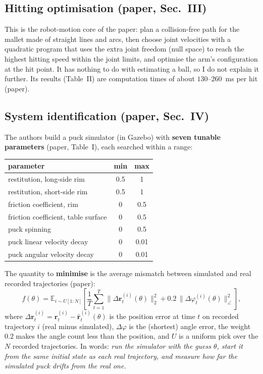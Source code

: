 \documentclass[11pt,a4paper]{article}
\begin{document}
\subsection{Hitting optimisation (paper, Sec.~III)}
This is the robot-motion core of the paper: plan a collision-free path for the mallet made of
straight lines and arcs, then choose joint velocities with a quadratic program that uses the extra
joint freedom (null space) to reach the highest hitting speed within the joint limits, and
optimise the arm's configuration at the hit point. It has nothing to do with estimating a ball, so
I do not explain it further. Its results (Table~II) are computation times of about $130$--$260$~ms
per hit (paper).

\subsection{System identification (paper, Sec.~IV)}
\label{sec:sysid}
The authors build a puck simulator (in Gazebo) with \textbf{seven tunable parameters} (paper,
Table~I), each searched within a range:

\begin{center}
\small
\begin{tabular}{@{}lcc@{}}
\toprule
parameter & min & max \\
\midrule
restitution, long-side rim & 0.5 & 1 \\
restitution, short-side rim & 0.5 & 1 \\
friction coefficient, rim & 0 & 0.5 \\
friction coefficient, table surface & 0 & 0.5 \\
puck spinning & 0 & 0.5 \\
puck linear velocity decay & 0 & 0.01 \\
puck angular velocity decay & 0 & 0.01 \\
\bottomrule
\end{tabular}
\end{center}

The quantity to \textbf{minimise} is the average mismatch between simulated and real recorded
trajectories (paper):
\[
f(\theta)=\mathbb E_{i\sim U[1:N]}\!\left[\frac1T\sum_{t=1}^{T}\|\Delta\bm r_t^{(i)}(\theta)\|_2^2+0.2\,\|\Delta\varphi_t^{(i)}(\theta)\|_\angle^2\right],
\]
where $\Delta\bm r_t^{(i)}=\bm r_t^{(i)}-\hat{\bm r}_t^{(i)}(\theta)$ is the position error at time $t$ on
recorded trajectory $i$ (real minus simulated), $\Delta\varphi$ is the (shortest) angle error, the
weight $0.2$ makes the angle count less than the position, and $U$ is a uniform pick over the $N$
recorded trajectories. In words: \emph{run the simulator with the guess $\theta$, start it from the
same initial state as each real trajectory, and measure how far the simulated puck drifts from the
real one.}
\end{document}

